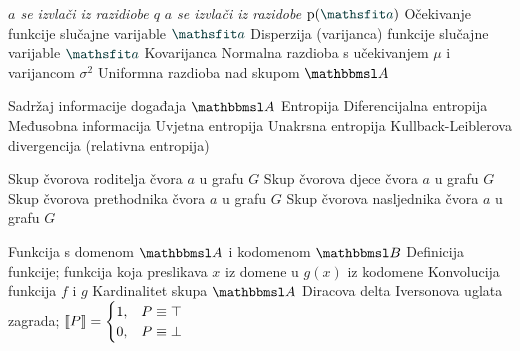  {\textit{$a$ se izvlači iz razidiobe $q$}}
 {\textit{$a$ se izvlači iz razidobe $\p(\rvar a)$}}
 {Očekivanje funkcije slučajne varijable $\rvar a$}
 {Disperzija (varijanca) funkcije slučajne varijable $\rvar a$}
		{Kovarijanca}
 {Normalna razdioba s učekivanjem $\mu$ i varijancom $\sigma^2$}
 {Uniformna razdioba nad skupom $\set A$}

			{Sadržaj informacije događaja $\set A$}
			{Entropija}
			{Diferencijalna entropija}
	  {Međusobna informacija}
 {Uvjetna entropija}
 {Unakrsna entropija}
 {Kullback-Leiblerova divergencija (relativna entropija)}

	{Skup čvorova roditelja čvora $a$ u grafu $G$}
	{Skup čvorova djece čvora $a$ u grafu $G$}
	{Skup čvorova prethodnika čvora $a$ u grafu $G$}
	{Skup čvorova nasljednika čvora $a$ u grafu $G$}

 {Funkcija s domenom $\set A$ i kodomenom $\set B$}
 {Definicija funkcije; funkcija koja preslikava $x$ iz domene u $g(x)$ iz kodomene}
	{Konvolucija funkcija $f$ i $g$}
	{Kardinalitet skupa $\set A$}
	{Diracova delta}
 {Iversonova uglata zagrada; $\enbbracket{P}=\begin{cases} 1, & P \equiv \top \\ 0, & P \equiv \bot \end{cases}$}
